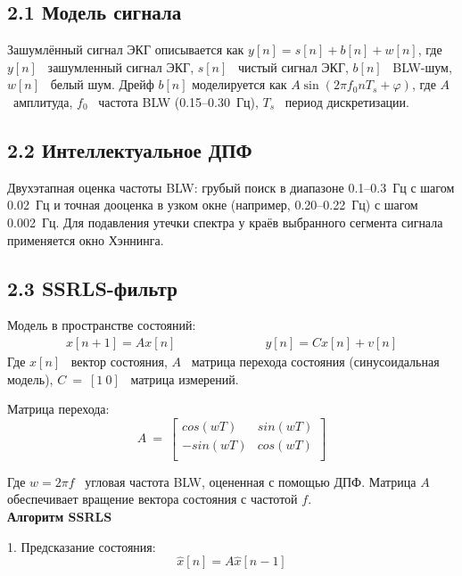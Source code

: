 \documentclass[10pt,a5paper]{article}
\numberwithin{figure}{section}
\numberwithin{table}{section}
\begin{document}
\subsection*{2.1 Модель сигнала}
Зашумлённый сигнал ЭКГ описывается как $y[n] = s[n] + b[n] + w[n]$, где 	$y[n]$ \textendash\ зашумленный сигнал ЭКГ, $s[n]$ \textendash\ чистый сигнал ЭКГ, $b[n]$ \textendash\ BLW-шум, $w[n]$ \textendash\ белый шум. Дрейф $b[n]$ моделируется как $A \sin(2\pi f_0 n T_s + \varphi)$, где $A$ \textendash\ амплитуда, $f_0$ \textendash\ частота BLW (0.15–0.30~Гц), $T_s$ \textendash\ период дискретизации.

\subsection*{2.2 Интеллектуальное ДПФ}
Двухэтапная оценка частоты BLW: грубый поиск в диапазоне 0.1–0.3~Гц с шагом 0.02~Гц и точная дооценка в узком окне (например, 0.20–0.22~Гц) с шагом 0.002~Гц. Для подавления утечки спектра у краёв выбранного сегмента сигнала применяется окно Хэннинга.

\subsection*{2.3 SSRLS-фильтр}
Модель в пространстве состояний:
\begin{gather*}
    x\left[n+1\right]=Ax\left[n\right] \hspace{3cm} y\left[n\right]=Cx\left[n\right]+v\left[n\right]
\end{gather*}
\noindent
Где 	$x\left[n\right]$ \textendash\ вектор состояния, $A$ \textendash\ матрица перехода состояния (синусоидальная модель), 	 $C\ =\ [1\ 0]$ \textendash\ матрица измерений.

Матрица перехода:
\begin{equation*}
  A\ =\ \left[\begin{matrix}cos\left(wT\right)&sin\left(wT\right)\\-sin\left(wT\right)&cos\left(wT\right)\\\end{matrix}\right]
\end{equation*}

Где $w=2\pi f$ \textendash\ угловая частота BLW, оцененная с помощью ДПФ. Матрица $A$ обеспечивает вращение вектора состояния с частотой $f$.\\
\textbf{Алгоритм SSRLS}

1. Предсказание состояния:  
   \[
   \hat{x}\left[n\right]=A\hat{x}\left[n-1\right]
   \]
\end{document}

